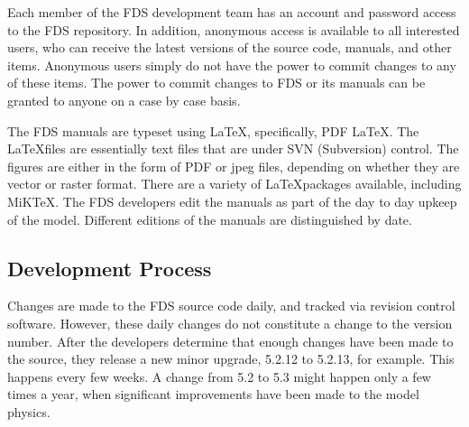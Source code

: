 \documentclass[11pt]{book}
\begin{document}
Each member of the FDS development team has an account and password
access to the FDS repository. In
addition, anonymous access is available to all interested users, who
can receive the latest versions of the source code, manuals, and other
items. Anonymous users simply do not have the power to commit changes
to any of these items. The power to commit changes to FDS or its
manuals can be granted to anyone on a case by case basis.

The FDS manuals are typeset using \LaTeX, specifically, PDF \LaTeX. The \LaTeX files are essentially text files that are under
SVN (Subversion) control. The figures are either in the form of PDF or jpeg files, depending on whether they are vector or
raster format. There are a variety of \LaTeX packages available, including MiKTeX. The FDS developers edit the manuals as part of the
day to day upkeep of the model. Different editions of the manuals are distinguished by date.


\subsection{Development Process}

Changes are made to the FDS source code daily, and tracked via
revision control software. However, these
daily changes do not constitute a change to the version number. After
the developers determine that enough changes have been made to the
source, they release a new minor upgrade, 5.2.12 to 5.2.13, for
example. This happens every few weeks. A change from 5.2 to 5.3 might
happen only a few times a year, when significant improvements have
been made to the model physics.
\end{document}
